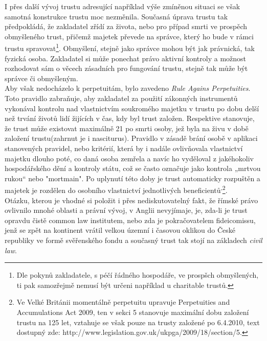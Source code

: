 \documentclass{article}
\begin{document}
I přes další vývoj trustu adresující například výše zmíněnou situaci se však samotná konstrukce trustu moc nezměnila. Současná úprava trustu tak předpokládá, že zakladatel zřídí za života, nebo pro případ smrti ve prospěch obmyšleného trust, přičemž majetek převede na správce, který ho bude v rámci trustu spravovat\footnote{Dle pokynů zakladatele, s péčí řádného hospodáře, ve prospšch obmyšlených, ti pak samozřejmě nemusí být určeni například u charitable trustů.}. Obmyšlení, stejně jako správce mohou být jak právnická, tak fyzická osoba. Zakladatel si může ponechat právo aktivní kontroly a možnost rozhodovat sám o věcech zásadních pro fungování trustu, stejně tak může být správce či obmyšleným.\\

Aby však nedocházelo k perpetuitám, bylo zavedeno \textit{Rule Agains Perpetuities}. Toto pravidlo zabraňuje, aby zakladatel za použití zákonných instrumentů vykonával kontrolu nad vlastnictvím soukromého majetku v trustu po dobu delší než trvání životů lidí žijících v čas, kdy byl trust založen. Respektive stanovuje, že trust může existovat maximálně 21 po smrti osoby, jež byla na živu v době založení trustu(zahrnut je i nasciturus). Pravidlo v zásadě brání osobě v aplikaci stanovených pravidel, nebo kritérií, která by i nadále ovlivňovala vlastnictví majetku dlouho poté, co daná osoba zemřela a navíc ho vyděloval z jakéhokoliv hospodářského dění a kontroly státu, což se často označuje jako kontrola „mrtvou rukou“ nebo "mortmain". Po uplynutí této doby je trust automaticky rozpuštěn a majetek je rozdělen do osobního vlastnictví jednotlivých beneficientů\textsuperscript{,}\footnote{Ve Velké Británii momentálně perpetuitu upravuje Perpetuities and Accumulations Act 2009, ten v sekci 5 stanovuje maximální dobu založení trustu na 125 let, vztahuje se však pouze na trusty založené po 6.4.2010, text dostupný zde: http://www.legislation.gov.uk/ukpga/2009/18/section/5.}.\\




Otázku, kterou je vhodné si položit i přes nediskutovatelný fakt, že římské právo ovlivnilo mnohé oblasti a právní vývoj, v Anglii nevyjímaje, je, zda-li je trust opravdu čistě common law institutem, nebo zda je pokračovatelem fideicomissu, jenž se zpět na kontinent vrátil velkou územní i časovou oklikou do České republiky ve formě svěřenského fondu a současný trust tak stojí na základech \textit{civil law}.\\
\end{document}
